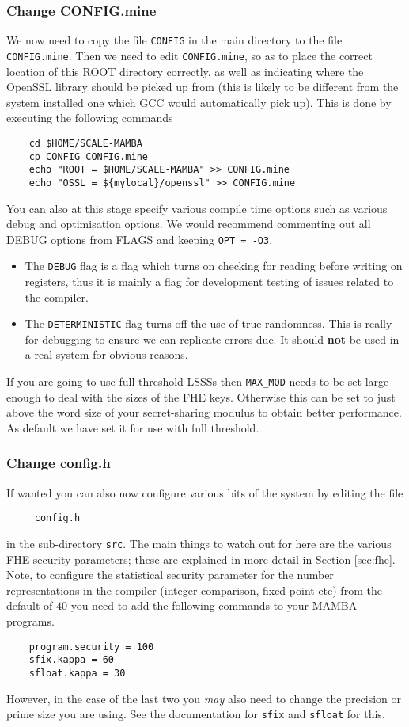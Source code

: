 \subsubsection{Change CONFIG.mine}
We now need to copy the file \verb+CONFIG+ in the main directory to the file
\verb+CONFIG.mine+.
Then we need to edit \verb+CONFIG.mine+, so as to place the correct
location of this ROOT directory correctly, 
as well as indicating where the OpenSSL library should be picked up 
from (this is likely to be different from the
system installed one which GCC would automatically pick up).
This is done by executing the following commands
\begin{verbatim}
    cd $HOME/SCALE-MAMBA
    cp CONFIG CONFIG.mine
    echo "ROOT = $HOME/SCALE-MAMBA" >> CONFIG.mine
    echo "OSSL = ${mylocal}/openssl" >> CONFIG.mine
\end{verbatim}
You can also at this stage specify various compile time options
such as various debug and optimisation options.
We would recommend commenting out all DEBUG options from FLAGS
and keeping \verb+OPT = -O3+.
\begin{itemize}
\item The \verb+DEBUG+ flag is a flag which turns on checking for 
reading before writing on registers, thus it is mainly a flag
for development testing of issues related to the compiler.
\item The \verb+DETERMINISTIC+ flag turns off the use of true randomness.
This is really for debugging to ensure we can replicate errors due.
It should {\bf not} be used in a real system for obvious reasons.
\end{itemize}
If you are going to use full threshold LSSSs then \verb+MAX_MOD+
needs to be set large enough to deal with the sizes of the FHE
keys. Otherwise this can be set to just above the word size of your
secret-sharing modulus to obtain better performance.
As default we have set it for use with full threshold.

\subsubsection{Change config.h}
If wanted you can also now configure various bits of the system
by editing the file
\begin{verbatim}
     config.h
\end{verbatim}
in the sub-directory \verb+src+.
The main things to watch out for here are the various FHE security parameters;
these are explained in more detail in Section \ref{sec:fhe}.
Note, to configure the statistical security parameter for the number representations
in the compiler (integer comparison, fixed point etc) from the default
of $40$ you need to add the following commands to your MAMBA programs.
\begin{verbatim}
    program.security = 100
    sfix.kappa = 60
    sfloat.kappa = 30
\end{verbatim}
However, in the case of the last two you {\em may} also need to change the
precision or prime size you are using. See the documentation for
\verb+sfix+ and \verb+sfloat+ for this.

